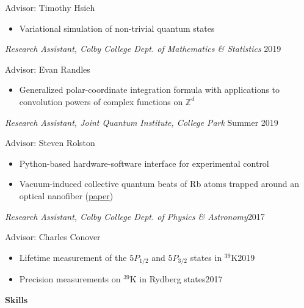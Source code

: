 \documentclass[10pt]{article}
\begin{document}
\vspace{2pt}
Advisor: Timothy Hsieh 
\vspace{-5pt}
\begin{itemize}
	\setlength\itemsep{-4pt}
	\item Variational simulation of non-trivial quantum states 
\end{itemize}


\noindent \textit{Research Assistant, Colby College Dept. of Mathematics \& Statistics} \hfill 2019

\vspace{2pt}
Advisor: Evan Randles 
\vspace{-5pt}
\begin{itemize}
	\setlength\itemsep{-4pt}
	\item Generalized polar-coordinate integration formula with applications to convolution powers of complex functions on $\mathbb{Z}^d$
\end{itemize}


\noindent \textit{Research Assistant, Joint Quantum Institute, College Park} \hfill Summer 2019

\vspace{2pt}
Advisor:  Steven Rolston
\vspace{-5pt}
\begin{itemize}
	\setlength\itemsep{-4pt}
	\item Python-based hardware-software interface for experimental control
	\item Vacuum-induced collective quantum beats of Rb atoms trapped around an optical nanofiber
	(\href{https://arxiv.org/abs/2102.11982}{paper})
\end{itemize}

\noindent \textit{Research Assistant, Colby College Dept. of Physics \& Astronomy}\hfill 2017

\vspace{2pt}
Advisor: Charles Conover 
\vspace{-5pt}
\begin{itemize}
	\setlength\itemsep{-4pt}
	\item Lifetime measurement of the $5P_{1/2}$ and $5P_{3/2}$ states in $^{\text{39}}$K\hfill 2019
	\item Precision measurements on $^{\text{39}}$K in Rydberg states\hfill 2017 
\end{itemize}



\noindent \large{\textbf{{Skills}}} \normalsize
\end{document}
